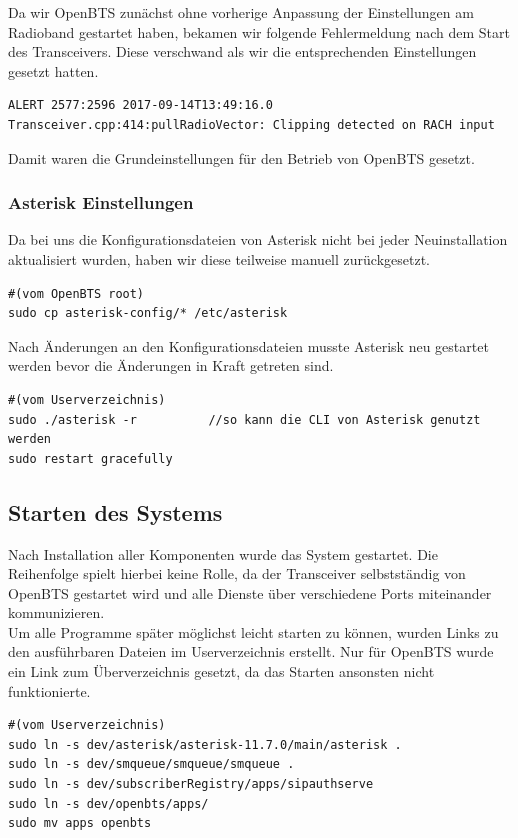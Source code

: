 Da wir OpenBTS zunächst ohne vorherige Anpassung der Einstellungen am Radioband gestartet haben, bekamen wir folgende Fehlermeldung nach dem Start des Transceivers. Diese verschwand als wir die entsprechenden Einstellungen gesetzt hatten.
\begin{lstlisting}
ALERT 2577:2596 2017-09-14T13:49:16.0 Transceiver.cpp:414:pullRadioVector: Clipping detected on RACH input
\end{lstlisting}

Damit waren die Grundeinstellungen für den Betrieb von OpenBTS gesetzt.

\subsubsection{Asterisk Einstellungen}
Da bei uns die Konfigurationsdateien von Asterisk nicht bei jeder Neuinstallation aktualisiert wurden, haben wir diese teilweise manuell zurückgesetzt.
\begin{lstlisting}
#(vom OpenBTS root)
sudo cp asterisk-config/* /etc/asterisk
\end{lstlisting}

Nach Änderungen an den Konfigurationsdateien musste Asterisk neu gestartet werden bevor die Änderungen in Kraft getreten sind.
\begin{lstlisting}
#(vom Userverzeichnis)
sudo ./asterisk -r			//so kann die CLI von Asterisk genutzt werden
sudo restart gracefully
\end{lstlisting}


\subsection{Starten des Systems}
Nach Installation aller Komponenten wurde das System gestartet. Die Reihenfolge spielt hierbei keine Rolle, da der Transceiver selbstständig von OpenBTS gestartet wird und alle Dienste über verschiedene Ports miteinander kommunizieren.\\
Um alle Programme später möglichst leicht starten zu können, wurden Links zu den ausführbaren Dateien im Userverzeichnis erstellt. Nur für OpenBTS wurde ein Link zum Überverzeichnis gesetzt, da das Starten ansonsten nicht funktionierte.
\begin{lstlisting}
#(vom Userverzeichnis)
sudo ln -s dev/asterisk/asterisk-11.7.0/main/asterisk .
sudo ln -s dev/smqueue/smqueue/smqueue .
sudo ln -s dev/subscriberRegistry/apps/sipauthserve
sudo ln -s dev/openbts/apps/
sudo mv apps openbts
\end{lstlisting}

